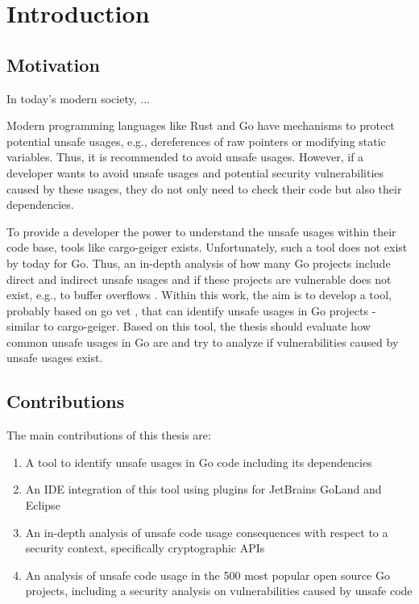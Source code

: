 
\chapter{Introduction}\label{ch:introduction}



\section{Motivation}\label{sec:motivation}

In today's modern society, ...

Modern programming languages like Rust and Go have mechanisms to protect potential
unsafe usages, e.g., dereferences of raw pointers or modifying static variables. Thus, it is
recommended to avoid unsafe usages. However, if a developer wants to avoid unsafe
usages and potential security vulnerabilities caused by these usages, they do not only need
to check their code but also their dependencies.

To provide a developer the power to understand the unsafe usages within their code base,
tools like cargo-geiger \cite{CargoGeiger} exists. Unfortunately, such a tool does not exist by today for Go.
Thus, an in-depth analysis of how many Go projects include direct and indirect unsafe
usages and if these projects are vulnerable does not exist, e.g., to buffer overflows
\cite{larochelle2001, alnaeli2017, wang2020}.
Within this work, the aim is to develop a tool, probably based on go vet \cite{GoVet}, that can identify
unsafe usages in Go projects - similar to cargo-geiger. Based on this tool, the thesis should
evaluate how common unsafe usages in Go are and try to analyze if vulnerabilities caused
by unsafe usages exist.





\section{Contributions}\label{sec:contributions}

The main contributions of this thesis are:

\begin{enumerate}
  \item A tool to identify unsafe usages in Go code including its dependencies
  \item An IDE integration of this tool using plugins for JetBrains GoLand and Eclipse
  \item An in-depth analysis of unsafe code usage consequences with respect to a security
        context, specifically cryptographic APIs
  \item An analysis of unsafe code usage in the 500 most popular open source Go projects,
        including a security analysis on vulnerabilities caused by unsafe code
\end{enumerate}



